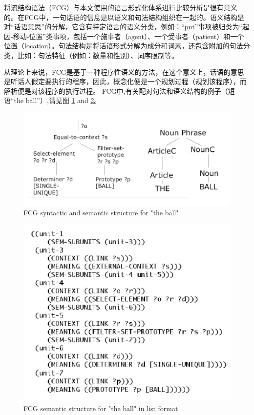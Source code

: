 将流结构语法（FCG）与本文使用的语言形式化体系进行比较分析是很有意义的。在FCG中，一句话语的信息是以语义和句法结构组织在一起的。语义结构是对“话语意思”的分解，它含有特定语言的语义分类，例如：“put”事项被归类为“起因-移动-位置”类事项，包括一个施事者（agent）、一个受事者（patient）和一个位置（location）。句法结构是将话语形式分解为成分和词素，还包含附加的句法分类，比如：句法特征（例如：数量和性别）、词序限制等。


从理论上来说，FCG是基于一种程序性语义的方法，在这个意义上，话语的意思是听话人假定要执行的程序，因此，概念化便是一个规划过程（规划该程序），而解析便是对该程序的执行过程。
FCG中,有关配对句法和语义结构的例子（短语“the ball”）,请见图 \ref{fig:fcg1} and \ref{fig:fcg2}。

\begin{figure}[htb]
\centering
\includegraphics[width=12cm]{figures/fcg1.png}
\caption{ FCG syntactic and semantic structure for "the ball" }
\label{fig:fcg1}
\end{figure}

\begin{figure}[htb]
\centering
\includegraphics[width=12cm]{figures/fcg2.png}
\caption{ FCG semantic structure for "the ball" in  list format}
\label{fig:fcg2}
\end{figure}


